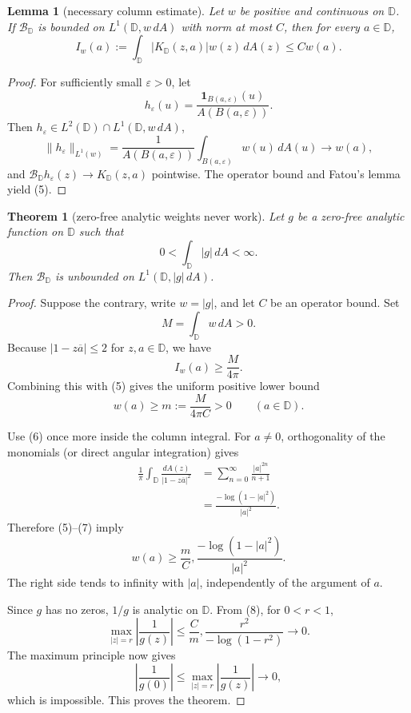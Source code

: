 \documentclass[11pt]{article}
\newtheorem{theorem}{Theorem}
\newtheorem{lemma}{Lemma}
\newcommand{\D}{\mathbb D}
\newcommand{\Berg}{\mathcal B}
\begin{document}
\begin{lemma}[necessary column estimate]
\label{lem:column}
Let $w$ be positive and continuous on $\D$.  If $\Berg_{\D}$ is bounded on
$L^1(\D,w\,dA)$ with norm at most $C$, then for every $a\in\D$,
\[
  I_w(a):=\int_{\D}|K_{\D}(z,a)|w(z)\,dA(z)\le Cw(a).  \tag{5}
\]
\end{lemma}

\begin{proof}
For sufficiently small $\varepsilon>0$, let
\[
  h_\varepsilon(u)=\frac{\mathbf 1_{B(a,\varepsilon)}(u)}
  {A(B(a,\varepsilon))}.
\]
Then $h_\varepsilon\in L^2(\D)\cap L^1(\D,w\,dA)$,
\[
  \|h_\varepsilon\|_{L^1(w)}
  =\frac{1}{A(B(a,\varepsilon))}
    \int_{B(a,\varepsilon)}w(u)\,dA(u)\longrightarrow w(a),
\]
and $\Berg_{\D}h_\varepsilon(z)\to K_{\D}(z,a)$ pointwise.  The operator
bound and Fatou's lemma yield (5).
\end{proof}

\begin{theorem}[zero-free analytic weights never work]
\label{thm:weighted}
Let $g$ be a zero-free analytic function on $\D$ such that
\[
  0<\int_{\D}|g|\,dA<\infty.
\]
Then $\Berg_{\D}$ is unbounded on $L^1(\D,|g|\,dA)$.
\end{theorem}

\begin{proof}
Suppose the contrary, write $w=|g|$, and let $C$ be an operator bound.
Set
\[
  M=\int_{\D}w\,dA>0.
\]
Because $|1-z\overline a|\le2$ for $z,a\in\D$, we have
\[
  I_w(a)\ge \frac{M}{4\pi}.
\]
Combining this with (5) gives the uniform positive lower bound
\[
  w(a)\ge m:=\frac{M}{4\pi C}>0
  \qquad(a\in\D).                                      \tag{6}
\]

Use (6) once more inside the column integral.  For $a\ne0$, orthogonality of
the monomials (or direct angular integration) gives
\begin{align*}
 \frac1\pi\int_{\D}\frac{dA(z)}{|1-z\overline a|^2}
 &=\sum_{n=0}^{\infty}\frac{|a|^{2n}}{n+1}\\
 &=\frac{-\log(1-|a|^2)}{|a|^2}.                       \tag{7}
\end{align*}
Therefore (5)--(7) imply
\[
  w(a)\ge \frac{m}{C},
  \frac{-\log(1-|a|^2)}{|a|^2}.                        \tag{8}
\]
The right side tends to infinity with $|a|$, independently of the argument
of $a$.

Since $g$ has no zeros, $1/g$ is analytic on $\D$.  From (8), for
$0<r<1$,
\[
  \max_{|z|=r}\left|\frac1{g(z)}\right|
  \le \frac{C}{m},
       \frac{r^2}{-\log(1-r^2)}\longrightarrow0.
\]
The maximum principle now gives
\[
  \left|\frac1{g(0)}\right|
  \le \max_{|z|=r}\left|\frac1{g(z)}\right|
  \longrightarrow0,
\]
which is impossible.  This proves the theorem.
\end{proof}
\end{document}
